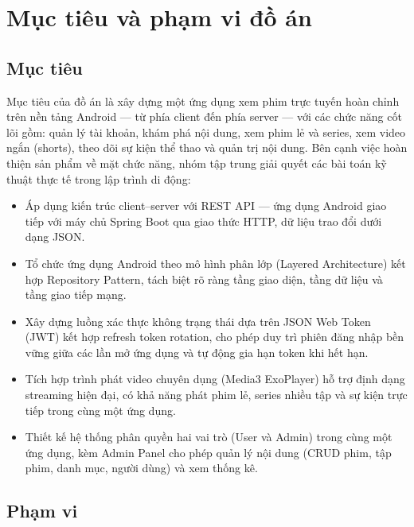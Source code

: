 \section{Mục tiêu và phạm vi đồ án}
\label{sec:muc_tieu_pham_vi}

\subsection{Mục tiêu}
\label{subsec:muc_tieu}

Mục tiêu của đồ án là xây dựng một ứng dụng xem phim trực tuyến hoàn chỉnh trên nền tảng
Android — từ phía client đến phía server — với các chức năng cốt lõi gồm: quản lý tài
khoản, khám phá nội dung, xem phim lẻ và series, xem video ngắn (shorts), theo dõi sự
kiện thể thao và quản trị nội dung. Bên cạnh việc hoàn thiện sản phẩm về mặt chức năng,
nhóm tập trung giải quyết các bài toán kỹ thuật thực tế trong lập trình di động:

\begin{itemize}
    \item Áp dụng kiến trúc client--server với REST API — ứng dụng Android giao tiếp với
    máy chủ Spring Boot qua giao thức HTTP, dữ liệu trao đổi dưới dạng JSON.

    \item Tổ chức ứng dụng Android theo mô hình phân lớp (Layered Architecture) kết hợp
    Repository Pattern, tách biệt rõ ràng tầng giao diện, tầng dữ liệu và tầng giao tiếp
    mạng.

    \item Xây dựng luồng xác thực không trạng thái dựa trên JSON Web Token (JWT) kết hợp
    refresh token rotation, cho phép duy trì phiên đăng nhập bền vững giữa các lần mở ứng
    dụng và tự động gia hạn token khi hết hạn.

    \item Tích hợp trình phát video chuyên dụng (Media3 ExoPlayer) hỗ trợ định dạng
    streaming hiện đại, có khả năng phát phim lẻ, series nhiều tập và sự kiện trực tiếp
    trong cùng một ứng dụng.

    \item Thiết kế hệ thống phân quyền hai vai trò (User và Admin) trong cùng một ứng
    dụng, kèm Admin Panel cho phép quản lý nội dung (CRUD phim, tập phim, danh mục, người
    dùng) và xem thống kê.
\end{itemize}

\subsection{Phạm vi}
\label{subsec:pham_vi}

